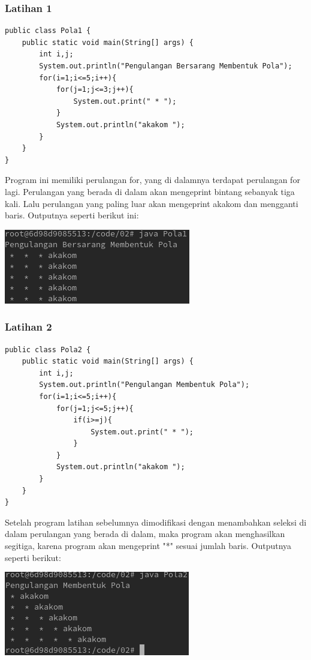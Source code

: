 \documentclass[a4paper,12pt]{article}
\begin{document}
\subsubsection{Latihan 1}
\begin{center}
    \begin{lstlisting}
public class Pola1 {
    public static void main(String[] args) {
        int i,j;
        System.out.println("Pengulangan Bersarang Membentuk Pola");
        for(i=1;i<=5;i++){
            for(j=1;j<=3;j++){
                System.out.print(" * ");
            }
            System.out.println("akakom ");
        }
    }
}
    \end{lstlisting}
\end{center}
Program ini memiliki perulangan for, yang di dalamnya terdapat perulangan for lagi. Perulangan yang berada di dalam akan mengeprint bintang sebanyak tiga kali. Lalu perulangan yang paling luar akan mengeprint akakom dan mengganti baris. Outputnya seperti berikut ini:\\
\begin{center}
\includegraphics[scale=.7]{11.png}
\end{center}

\newpage

\subsubsection{Latihan 2}
\begin{center}
    \begin{lstlisting}
public class Pola2 {
    public static void main(String[] args) {
        int i,j;
        System.out.println("Pengulangan Membentuk Pola");
        for(i=1;i<=5;i++){
            for(j=1;j<=5;j++){
                if(i>=j){
                    System.out.print(" * ");
                }
            }
            System.out.println("akakom ");
        }
    }
}
    \end{lstlisting}
\end{center}
Setelah program latihan sebelumnya dimodifikasi dengan menambahkan seleksi di dalam perulangan yang berada di dalam, maka program akan menghasilkan segitiga, karena program akan mengeprint "*"
sesuai jumlah baris. Outputnya seperti berikut:\\
\begin{center}
    \includegraphics[scale=.7]{12.png}
\end{center}
\end{document}
